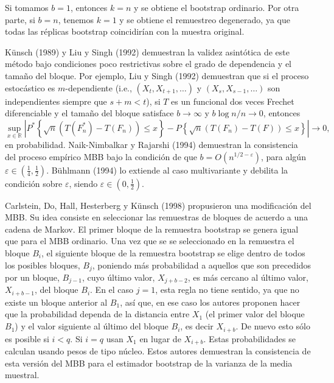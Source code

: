 \documentclass[
]{book}
\theoremstyle{break}
\theoremstyle{nonumberplain}
\begin{document}
Si tomamos \(b=1\), entonces \(k=n\) y se obtiene el bootstrap ordinario.
Por otra parte, si \(b=n\), tenemos \(k=1\) y se obtiene el remuestreo
degenerado, ya que todas las réplicas bootstrap coincidirían con la
muestra original.

Künsch (1989) y Liu y Singh (1992) demuestran la validez asintótica de
este método bajo condiciones poco restrictivas sobre el grado de
dependencia y el tamaño del bloque. Por ejemplo, Liu y Singh (1992)
demuestran que si el proceso estocástico es \(m\)-dependiente (i.e.,
\((X_{t},X_{t+1},\ldots )\) y \((X_{s},X_{s-1},\ldots )\) son independientes
siempre que \(s+m<t\)), si \(T\) es un funcional dos veces Frechet
diferenciable y el tamaño del bloque satisface \(b\rightarrow \infty\) y
\(b\log
n/n\rightarrow 0\), entonces
\[\sup_{x\in \mathbb{R}}\left\vert P^{\ast}\left\{ \sqrt{n}\left(
T(F_n^{\ast})-T\left( F_n \right) \right) \leq x\right\} -P\left\{ \sqrt{
n}\left( T(F_n)-T\left( F \right) \right) \leq x\right\} \right\vert
\rightarrow 0\mathrm{,}\]en probabilidad. Naik-Nimbalkar y Rajarshi
(1994) demuestran la consistencia del proceso empírico MBB bajo la
condición de que \(b=O(n^{1/2-\varepsilon })\), para algún
\(\varepsilon \in (\frac{1}{4},\frac{1}{2})\). Bühlmann (1994) lo extiende
al caso multivariante y debilita la condición sobre \(\varepsilon\),
siendo \(\varepsilon \in (0,\frac{1}{2})\).

Carlstein, Do, Hall, Hesterberg y Künsch (1998) propusieron una
modificación del MBB. Su idea consiste en seleccionar las remuestras de
bloques de acuerdo a una cadena de Markov. El primer bloque de la
remuestra bootstrap se genera igual que para el MBB ordinario. Una vez
que se se seleccionado en la remuestra el bloque \(B_i\), el siguiente
bloque de la remuestra bootstrap se elige dentro de todos los posibles
bloques, \(B_j\), poniendo más probabilidad a aquellos que son
precedidos por un bloque,
\(B_{j-1}\), cuyo último valor, \(X_{j+b-2}\), es más cercano al último
valor, \(X_{i+b-1}\), del bloque \(B_i\). En el caso \(j=1\), esta regla no
tiene sentido, ya que no existe un bloque anterior al \(B_1\), así que,
en ese caso los autores proponen hacer que la probabilidad dependa de la
distancia entre \(X_1\) (el primer valor del bloque \(B_1\)) y el valor
siguiente al último del bloque \(B_i\), es decir \(X_{i+b}\). De nuevo
esto sólo es posible si \(i<q\). Si \(i=q\) usan \(X_1\) en lugar de
\(X_{i+b}\). Estas probabilidades se calculan usando pesos de tipo núcleo.
Estos autores demuestran la consistencia de esta versión del MBB para el
estimador bootstrap de la varianza de la media muestral.
\end{document}
